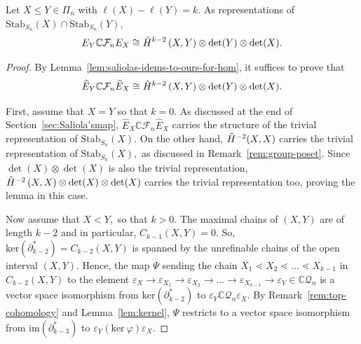 \documentclass[ALCO, Unicode]{cedram}
\def \ker{\mathrm{ker}}
\def \im{\mathrm{im}}
\def\C{{\mathbb{C}}}
\def\stab{\mathrm{Stab}}
\begin{document}
\begin{lemma}\label{prop:change-coho}
    Let $X \leq Y \in \Pi_n$ with $\ell(X) - \ell(Y) = k.$ As representations of $\stab_{S_n}(X) \cap \stab_{S_n}(Y),$
    \[E_Y \C \mathcal{F}_n E_X \cong \Tilde{H}^{k - 2}\left(X, Y\right) \otimes \det(Y) \otimes \det(X).\]
\end{lemma}
\begin{proof}
By Lemma~\ref{lem:saliolas-idems-to-ours-for-hom}, it suffices to prove that \[\widehat{E}_Y \C \mathcal{F}_n \widehat{E}_X \cong \Tilde{H}^{k - 2}\left(X, Y\right) \otimes \det(Y) \otimes \det(X).\]

First, assume that $X = Y$ so that $k = 0.$ As discussed at the end of Section~\ref{sec:Saliola'smap},  $\widehat{E}_X \C \mathcal{F}_n \widehat{E}_X$ carries the structure of the trivial representation of $\stab_{S_n}(X).$ 
On the other hand, $\Tilde{H}^{-2}(X, X)$ carries the trivial representation of $\stab_{S_n}(X),$ as discussed in Remark~\ref{rem:group-poset}. Since $\det(X) \otimes \det(X)$ is also the trivial representation, $\Tilde{H}^{-2}\left(X, X\right) \otimes \det(X) \otimes \det(X)$ carries the trivial representation too, proving the lemma in this case.

Now assume that $X < Y,$ so that $k > 0.$ The maximal chains of $(X, Y)$ are of length $k - 2$ and in particular, $C_{k - 1}(X, Y) = 0.$ So, $\ker \left(\partial_{k - 2}^\ast\right) = C_{k - 2}(X, Y)$ is spanned by the unrefinable chains of the open interval $(X, Y).$  Hence, the map $\Psi$ sending the chain $X_1 \lessdot X_2 \lessdot \ldots \lessdot X_{k - 1}$ in $C_{k - 2}(X, Y)$ to the element $\varepsilon_X \to \varepsilon_{X_1} \to \varepsilon_{X_2}\to \ldots \to \varepsilon_{X_{k - 1}} \to \varepsilon_{Y} \in \C \mathcal{Q}_n$ is a vector space isomorphism from $\ker \left( \partial_{k - 2}^\ast \right)$ to $\varepsilon_Y \C \mathcal{Q}_n \varepsilon_X.$ By Remark~\ref{rem:top-cohomology} and Lemma~\ref{lem:kernel}, $\Psi$ restricts to a vector space isomorphism  from $\im \left(\partial_{k - 3}^\ast \right)$ to $\varepsilon_Y \left(\ker \ \varphi \right) \varepsilon_X.$ 
     

\end{proof}
\end{document}
